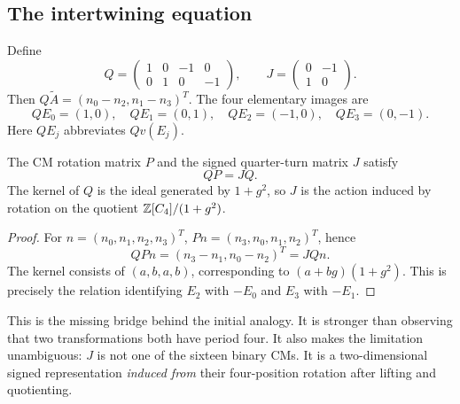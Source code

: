 \subsection{The intertwining equation}
Define
\begin{equation}\label{eq:QJ}
 Q=\begin{pmatrix}1&0&-1&0\\0&1&0&-1\end{pmatrix},\qquad
 J=\begin{pmatrix}0&-1\\1&0\end{pmatrix}.
\end{equation}
Then $Q\widetilde A=(n_0-n_2,n_1-n_3)^T$. The four elementary images are
\begin{equation}
 QE_0=(1,0),\quad QE_1=(0,1),\quad QE_2=(-1,0),\quad QE_3=(0,-1).
\end{equation}
Here $QE_j$ abbreviates $Qv(E_j)$.

\begin{theorem}\label{thm:intertwiner}
The CM rotation matrix $P$ and the signed quarter-turn matrix $J$ satisfy
\begin{equation}\label{eq:intertwiner}
 QP=JQ.
\end{equation}
The kernel of $Q$ is the ideal generated by $1+g^2$, so $J$ is the action induced by rotation on the quotient $\mathbb Z[C_4]/(1+g^2)$.
\end{theorem}
\begin{proof}
For $n=(n_0,n_1,n_2,n_3)^T$, $Pn=(n_3,n_0,n_1,n_2)^T$, hence
\begin{equation}
 QPn=(n_3-n_1,n_0-n_2)^T=JQn.
\end{equation}
The kernel consists of $(a,b,a,b)$, corresponding to $(a+bg)(1+g^2)$. This is precisely the relation identifying $E_2$ with $-E_0$ and $E_3$ with $-E_1$.
\end{proof}
This is the missing bridge behind the initial analogy. It is stronger than observing that two transformations both have period four. It also makes the limitation unambiguous: $J$ is not one of the sixteen binary CMs. It is a two-dimensional signed representation \emph{induced from} their four-position rotation after lifting and quotienting.

